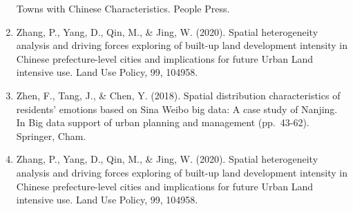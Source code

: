 \documentclass[
]{article}
\begin{document}
\begin{enumerate}
  Towns with Chinese Characteristics. People Press.
\item
  Zhang, P., Yang, D., Qin, M., \& Jing, W. (2020). Spatial
  heterogeneity analysis and driving forces exploring of built-up land
  development intensity in Chinese prefecture-level cities and
  implications for future Urban Land intensive use. Land Use Policy, 99,
  104958.
\item
  Zhen, F., Tang, J., \& Chen, Y. (2018). Spatial distribution
  characteristics of residents' emotions based on Sina Weibo big data: A
  case study of Nanjing. In Big data support of urban planning and
  management (pp.~43-62). Springer, Cham.
\item
  Zhang, P., Yang, D., Qin, M., \& Jing, W. (2020). Spatial
  heterogeneity analysis and driving forces exploring of built-up land
  development intensity in Chinese prefecture-level cities and
  implications for future Urban Land intensive use. Land Use Policy, 99,
  104958.
\end{enumerate}
\end{document}
